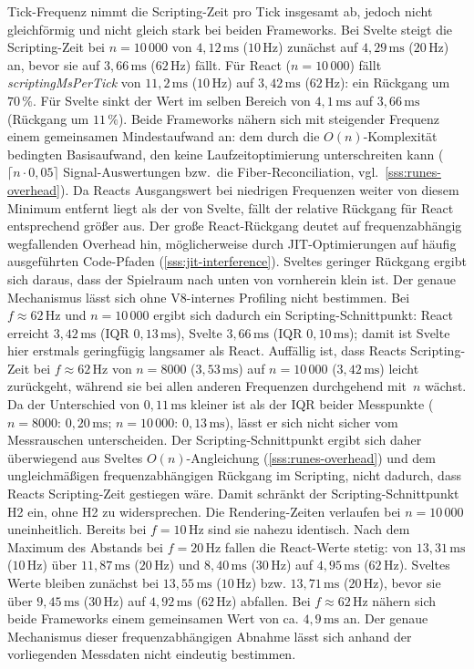 Tick-Frequenz nimmt die Scripting-Zeit pro Tick insgesamt ab, jedoch nicht gleichförmig und nicht gleich stark bei beiden Frameworks. Bei Svelte steigt die Scripting-Zeit bei $n = 10\,000$ von $4{,}12\,\text{ms}$ ($10\,\text{Hz}$) zunächst auf $4{,}29\,\text{ms}$ ($20\,\text{Hz}$) an, bevor sie auf $3{,}66\,\text{ms}$ ($62\,\text{Hz}$) fällt. Für React ($n = 10\,000$) fällt \textit{scriptingMsPerTick} von $11{,}2\,\text{ms}$ ($10\,\text{Hz}$) auf $3{,}42\,\text{ms}$ ($62\,\text{Hz}$): ein Rückgang um $70\,\%$. Für Svelte sinkt der Wert im selben Bereich von $4{,}1\,\text{ms}$ auf $3{,}66\,\text{ms}$ (Rückgang um $11\,\%$). Beide Frameworks nähern sich mit steigender Frequenz einem gemeinsamen Mindestaufwand an: dem durch die $O(n)$-Komplexität bedingten Basisaufwand, den keine Laufzeitoptimierung unterschreiten kann ($\lceil n \cdot 0{,}05 \rceil$ Signal-Auswertungen bzw.\ die Fiber-Reconciliation, vgl.\ \cref{sss:runes-overhead}). Da Reacts Ausgangswert bei niedrigen Frequenzen weiter von diesem Minimum entfernt liegt als der von Svelte, fällt der relative Rückgang für React entsprechend größer aus. Der große React-Rückgang deutet auf frequenzabhängig wegfallenden Overhead hin, möglicherweise durch JIT-Optimierungen auf häufig ausgeführten Code-Pfaden (\cref{sss:jit-interference}). Sveltes geringer Rückgang ergibt sich daraus, dass der Spielraum nach unten von vornherein klein ist. Der genaue Mechanismus lässt sich ohne V8-internes Profiling nicht bestimmen. Bei $f \approx 62\,\text{Hz}$ und $n = 10\,000$ ergibt sich dadurch ein Scripting-Schnittpunkt: React erreicht $3{,}42\,\text{ms}$ (IQR $0{,}13\,\text{ms}$), Svelte $3{,}66\,\text{ms}$ (IQR $0{,}10\,\text{ms}$); damit ist Svelte hier erstmals geringfügig langsamer als React. Auffällig ist, dass Reacts Scripting-Zeit bei $f \approx 62\,\text{Hz}$ von $n = 8000$ ($3{,}53\,\text{ms}$) auf $n = 10\,000$ ($3{,}42\,\text{ms}$) leicht zurückgeht, während sie bei allen anderen Frequenzen durchgehend mit~$n$ wächst. Da der Unterschied von $0{,}11\,\text{ms}$ kleiner ist als der IQR beider Messpunkte ($n = 8000$: $0{,}20\,\text{ms}$; $n = 10\,000$: $0{,}13\,\text{ms}$), lässt er sich nicht sicher vom Messrauschen unterscheiden. Der Scripting-Schnittpunkt ergibt sich daher überwiegend aus Sveltes $O(n)$-Angleichung (\cref{sss:runes-overhead}) und dem ungleichmäßigen frequenzabhängigen Rückgang im Scripting, nicht dadurch, dass Reacts Scripting-Zeit gestiegen wäre. Damit schränkt der Scripting-Schnittpunkt H2 ein, ohne H2 zu widersprechen. Die Rendering-Zeiten verlaufen bei $n = 10\,000$ uneinheitlich. Bereits bei $f = 10\,\text{Hz}$ sind sie nahezu identisch. Nach dem Maximum des Abstands bei $f = 20\,\text{Hz}$ fallen die React-Werte stetig: von $13{,}31\,\text{ms}$ ($10\,\text{Hz}$) über $11{,}87\,\text{ms}$ ($20\,\text{Hz}$) und $8{,}40\,\text{ms}$ ($30\,\text{Hz}$) auf $4{,}95\,\text{ms}$ ($62\,\text{Hz}$). Sveltes Werte bleiben zunächst bei $13{,}55\,\text{ms}$ ($10\,\text{Hz}$) bzw. $13{,}71\,\text{ms}$ ($20\,\text{Hz}$), bevor sie über $9{,}45\,\text{ms}$ ($30\,\text{Hz}$) auf $4{,}92\,\text{ms}$ ($62\,\text{Hz}$) abfallen. Bei $f \approx 62\,\text{Hz}$ nähern sich beide Frameworks einem gemeinsamen Wert von ca. $4{,}9\,\text{ms}$ an. Der genaue Mechanismus dieser frequenzabhängigen Abnahme lässt sich anhand der vorliegenden Messdaten nicht eindeutig bestimmen.
